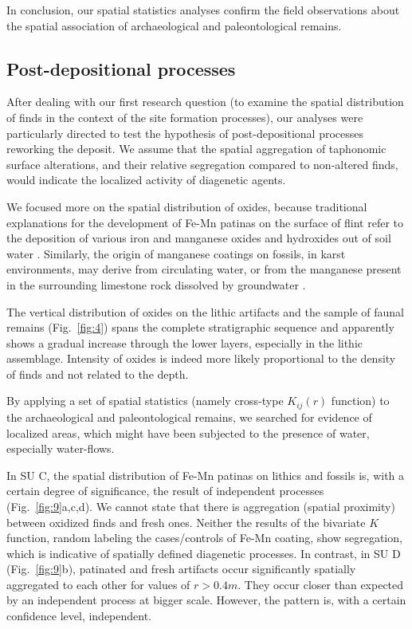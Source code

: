 \documentclass[5p,authoryear]{elsarticle} %
\begin{document}
In conclusion, our spatial statistics analyses confirm the field observations about the spatial association of archaeological and paleontological remains.

\subsection{Post-depositional processes}

After dealing with our first research question (to examine the spatial distribution of finds in the context of the site formation processes), our analyses were particularly directed to test the hypothesis of post-depositional processes reworking the deposit. We assume that the spatial aggregation of taphonomic surface alterations, and their relative segregation compared to non-altered finds, would indicate the localized activity of diagenetic agents.

We focused more on the spatial distribution of oxides, because traditional explanations for the development of Fe-Mn patinas on the surface of flint refer to the deposition of various iron and manganese oxides and hydroxides out of soil water \citep{Stapert1976}. Similarly, the origin of manganese coatings on fossils, in karst environments, may derive from circulating water, or from the manganese present in the surrounding limestone rock dissolved by groundwater \citep{Hill1982}.

The vertical distribution of oxides on the lithic artifacts and the sample of faunal remains (Fig.~\ref{fig:4}) spans the complete stratigraphic sequence and apparently shows a gradual increase through the lower layers, especially in the lithic assemblage. Intensity of oxides is indeed more likely proportional to the density of finds and not related to the depth.

By applying a set of spatial statistics (namely cross-type $K_{ij}(r)$ function) to the archaeological and paleontological remains, we searched for evidence of localized areas, which might have been subjected to the presence of water, especially water-flows.

In SU C, the spatial distribution of Fe-Mn patinas on lithics and fossils is, with a certain degree of significance, the result of independent processes (Fig.~\ref{fig:9}a,c,d). We cannot state that there is aggregation (spatial proximity) between oxidized finds and fresh ones. Neither the results of the bivariate $K$ function, random labeling the cases/controls of Fe-Mn coating, show segregation, which is indicative of spatially defined diagenetic processes. In contrast, in SU D (Fig.~\ref{fig:9}b), patinated and fresh artifacts occur significantly spatially aggregated to each other for values of $r>0.4 m$. They occur closer than expected by an independent process at bigger scale. However, the pattern is, with a certain confidence level, independent.
\end{document}
